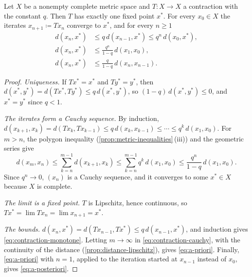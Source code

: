 \begin{theorem}
\label{thm:banach-fixed-point}
Let $X$ be a nonempty complete metric space and $T\colon X\to X$ a contraction with the constant $q$. Then $T$ has exactly one fixed point $x^*$. For every $x_0\in X$ the iterates $x_{n+1}\coloneqq Tx_n$ converge to $x^*$, and for every $n\ge1$
\begin{align}
d(x_n,x^*)&\le q\,d(x_{n-1},x^*)\le q^n\,d(x_0,x^*), \label{eq:contraction-monotone}\\
d(x_n,x^*)&\le\frac{q^n}{1-q}\,d(x_1,x_0) , \label{eq:a-priori}\\
d(x_n,x^*)&\le\frac q{1-q}\,d(x_n,x_{n-1}) . \label{eq:a-posteriori}
\end{align}
\end{theorem}

\begin{proof}
\emph{Uniqueness.} If $Tx^*=x^*$ and $Ty^*=y^*$, then $d(x^*,y^*)=d(Tx^*,Ty^*)\le q\,d(x^*,y^*)$, so $(1-q)\,d(x^*,y^*)\le0$, and $x^*=y^*$ since $q<1$.

\emph{The iterates form a Cauchy sequence.} By induction, $d(x_{k+1},x_k)=d(Tx_k,Tx_{k-1})\le q\,d(x_k,x_{k-1})\le\cdots\le q^k\,d(x_1,x_0)$. For $m>n$, the polygon inequality (\cref{prop:metric-inequalities}\,(iii)) and the geometric series give
\begin{equation}
d(x_m,x_n)\le\sum_{k=n}^{m-1}d(x_{k+1},x_k)\le\sum_{k=n}^{m-1}q^k\,d(x_1,x_0)\le\frac{q^n}{1-q}\,d(x_1,x_0) .
\label{eq:contraction-cauchy}
\end{equation}
Since $q^n\to0$, $(x_n)$ is a Cauchy sequence, and it converges to some $x^*\in X$ because $X$ is complete.

\emph{The limit is a fixed point.} $T$ is Lipschitz, hence continuous, so $Tx^*=\lim Tx_n=\lim x_{n+1}=x^*$.

\emph{The bounds.} $d(x_n,x^*)=d(Tx_{n-1},Tx^*)\le q\,d(x_{n-1},x^*)$, and induction gives \eqref{eq:contraction-monotone}. Letting $m\to\infty$ in \eqref{eq:contraction-cauchy}, with the continuity of the distance (\cref{prop:distance-lipschitz}), gives \eqref{eq:a-priori}. Finally, \eqref{eq:a-priori} with $n=1$, applied to the iteration started at $x_{n-1}$ instead of $x_0$, gives \eqref{eq:a-posteriori}.
\end{proof}

